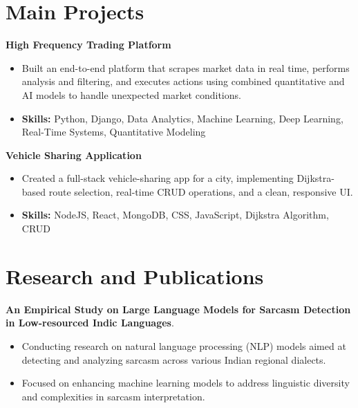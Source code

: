 \documentclass[a4paper,11pt]{article}
\begin{document}
\section{\textbf{Main Projects}}

\vspace{1mm}
  \textbf{High Frequency Trading Platform  }
\vspace{-1.5mm} %
\begin{itemize}
  \item Built an end-to-end platform that scrapes market data in real time, performs analysis and filtering, and executes actions using combined quantitative and AI models to handle unexpected market conditions.
\vspace{-3mm}
  \item \textbf{Skills:} Python, Django, Data Analytics, Machine Learning, Deep Learning, Real-Time Systems, Quantitative Modeling
\end{itemize}


\vspace{1mm}
   \textbf{Vehicle Sharing Application }
\vspace{-1.5mm} %
\begin{itemize}
  \item Created a full-stack vehicle-sharing app for a city, implementing Dijkstra-based route selection, real-time CRUD operations, and a clean, responsive UI.
\vspace{-3mm}
  \item \textbf{Skills:} NodeJS, React, MongoDB, CSS, JavaScript, Dijkstra Algorithm, CRUD
\end{itemize}



\section{\textbf{Research and Publications} \hfill }
\vspace{1mm}
  \textbf{An Empirical Study on Large Language Models for Sarcasm Detection in Low-resourced Indic Languages}.
\vspace{-1mm} %
\begin{itemize}
  \item Conducting research on natural language processing (NLP) models aimed at detecting and analyzing sarcasm across various Indian regional dialects.
\vspace{-3mm}
  \item Focused on enhancing machine learning models to address linguistic diversity and complexities in sarcasm interpretation.
\end{itemize}
\end{document}
